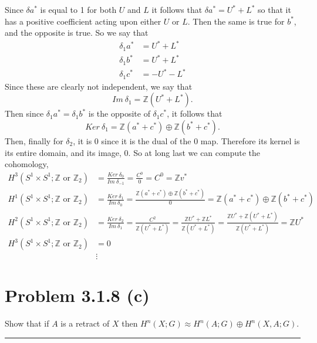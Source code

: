 \documentclass{article}
\theoremstyle{definition}
\begin{document}
Since $\delta a^*$ is equal to 1 for both $U$ and $L$ it follows that 
$\delta a^* = U^* + L^*$ so that it has a positive coefficient acting 
upon either $U$ or $L$.
Then the same is true for $b^*$, and the opposite is true. So we say that
\begin{align*}
    \delta_1 a^* &= U^* + L^* \\
    \delta_1 b^* &= U^* + L^* \\
    \delta_1 c^* &= -U^* - L^*
\end{align*}
Since these are clearly not independent, we say that
\[
    Im \ \delta_1 = \mathbb{Z}(U^* + L^*)
.\]
Then since $\delta_1 a^* = \delta_1 b^*$ is the opposite of $\delta_1 c^*$,
it follows that 
\[
    Ker \ \delta_1 = \mathbb{Z}(a^* + c^*) \oplus \mathbb{Z}(b^* + c^*)
.\]
Then, finally for $\delta_2$, it is 0 since it is the dual of the 0 map.
Therefore its kernel is its entire domain, and its image, 0.
So at long last we can compute the cohomology,
\begin{align*}
    H^3(S^1 \times S^1; \mathbb{Z}\text{ or }\mathbb{Z}_2) &= \frac{Ker \ \delta_0}{Im \ \delta_{-1}} = \frac{C^0}{0} = C^0 = \mathbb{Z}v^* \\
    H^1(S^1 \times S^1; \mathbb{Z}\text{ or }\mathbb{Z}_2) &= \frac{Ker \ \delta_1}{Im \ \delta_0} = \frac{\mathbb{Z}(a^* + c^*) \oplus \mathbb{Z}(b^* + c^*)}{0} = \mathbb{Z}(a^* + c^*) \oplus \mathbb{Z}(b^* + c^*) \\
    H^2(S^1 \times S^1; \mathbb{Z}\text{ or }\mathbb{Z}_2) &= \frac{Ker \ \delta_2}{Im \ \delta_1} = \frac{C^2}{\mathbb{Z}(U^* + L^*)} = \frac{\mathbb{Z}U^* + \mathbb{Z}L^*}{\mathbb{Z}(U^* + L^*)} = \frac{\mathbb{Z}U^* + \mathbb{Z}(U^* + L^*)}{\mathbb{Z}(U^* + L^*)} = \mathbb{Z}U^* \\
    H^3(S^1 \times S^1; \mathbb{Z}\text{ or }\mathbb{Z}_2) &= 0 \\
    & \vdots
\end{align*}

\section*{Problem 3.1.8 (c)}
Show that if $A$ is a retract of $X$ then $H^n(X;G) \approx H^n(A;G) \oplus H^n(X,A;G)$.
\\
\par\noindent\rule{\textwidth}{0.4pt}
\end{document}
